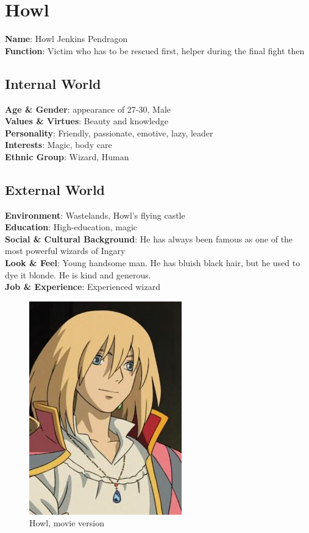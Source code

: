 \section{Howl}

\begin{minipage}{0.5\textwidth}
\textbf{Name}: Howl Jenkins Pendragon \\
\textbf{Function}: Victim who has to be rescued first, helper during the final fight then

\subsection{Internal World}

\textbf{Age \& Gender}: appearance of 27-30, Male \\
\textbf{Values \& Virtues}: Beauty and knowledge \\
\textbf{Personality}: Friendly, passionate, emotive, lazy, leader \\
\textbf{Interests}: Magic, body care \\
\textbf{Ethnic Group}: Wizard, Human

\subsection{External World}
\textbf{Environment}: Wastelands, Howl's flying castle \\
\textbf{Education}: High-education, magic \\
\textbf{Social \& Cultural Background}: He has always been famous as one of the most powerful wizards of Ingary \\
\textbf{Look \& Feel}: Young handsome man. He has bluish black hair, but he used to dye it blonde. He is kind and generous. \\
\textbf{Job \& Experience}: Experienced wizard \\

\end{minipage}%
%
\hfill\begin{minipage}{0.4\textwidth}
  \begin{figure}[H]
    \hfill\includegraphics{Images/Characters/howl}
    \caption{Howl, movie version}
  \end{figure}
\end{minipage}


